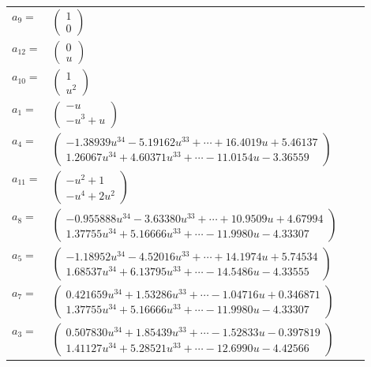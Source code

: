 \documentclass[1p]{elsarticle_modified}
\theoremstyle{definition}
\begin{document}
\begin{tabular}{m{7pt} m{180pt} m{7pt} m{180pt} }
\flushright $a_{9}=$&$\begin{pmatrix}1\\0\end{pmatrix}$ \\
\flushright $a_{12}=$&$\begin{pmatrix}0\\u\end{pmatrix}$ \\
\flushright $a_{10}=$&$\begin{pmatrix}1\\u^2\end{pmatrix}$ \\
\flushright $a_{1}=$&$\begin{pmatrix}- u\\- u^3+u\end{pmatrix}$ \\
\flushright $a_{4}=$&$\begin{pmatrix}-1.38939 u^{34}-5.19162 u^{33}+\cdots+16.4019 u+5.46137\\1.26067 u^{34}+4.60371 u^{33}+\cdots-11.0154 u-3.36559\end{pmatrix}$ \\
\flushright $a_{11}=$&$\begin{pmatrix}- u^2+1\\- u^4+2 u^2\end{pmatrix}$ \\
\flushright $a_{8}=$&$\begin{pmatrix}-0.955888 u^{34}-3.63380 u^{33}+\cdots+10.9509 u+4.67994\\1.37755 u^{34}+5.16666 u^{33}+\cdots-11.9980 u-4.33307\end{pmatrix}$ \\
\flushright $a_{5}=$&$\begin{pmatrix}-1.18952 u^{34}-4.52016 u^{33}+\cdots+14.1974 u+5.74534\\1.68537 u^{34}+6.13795 u^{33}+\cdots-14.5486 u-4.33555\end{pmatrix}$ \\
\flushright $a_{7}=$&$\begin{pmatrix}0.421659 u^{34}+1.53286 u^{33}+\cdots-1.04716 u+0.346871\\1.37755 u^{34}+5.16666 u^{33}+\cdots-11.9980 u-4.33307\end{pmatrix}$ \\
\flushright $a_{3}=$&$\begin{pmatrix}0.507830 u^{34}+1.85439 u^{33}+\cdots-1.52833 u-0.397819\\1.41127 u^{34}+5.28521 u^{33}+\cdots-12.6990 u-4.42566\end{pmatrix}$ \\

\end{tabular}
\end{document}
